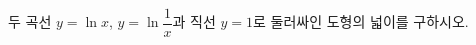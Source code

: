 \hspace*{2mm}\begin{minipage}[t]{\dimexpr\linewidth-2mm\relax}\vspace{0pt}
두 곡선 $y=\ln x$, $y=\ln\dfrac{1}{x}$과 직선 $y=1$로 둘러싸인 도형의 넓이를 구하시오.\end{minipage}
